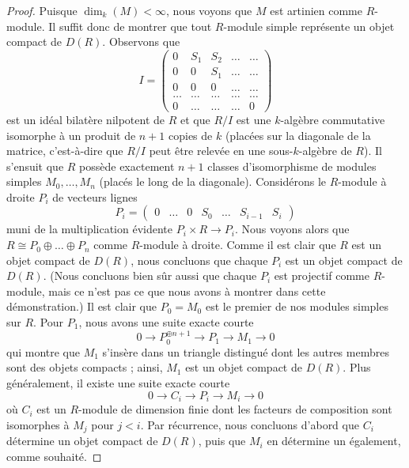 \begin{proof}
\medskip\noindent
Puisque $\dim_k(M) < \infty$, nous voyons que $M$ est artinien comme $R$-module.
Il suffit donc de montrer que tout $R$-module simple représente un
objet compact de $D(R)$. Observons que
$$
I =
\left(
\begin{matrix}
0 & S_1 & S_2 & \ldots & \ldots \\
0 & 0 & S_1 & \ldots & \ldots\\
0 & 0 & 0 & \ldots & \ldots \\
\ldots & \ldots & \ldots & \ldots & \ldots \\
0 & \ldots & \ldots & \ldots & 0
\end{matrix}
\right)
$$
est un idéal bilatère nilpotent de $R$ et que $R/I$
est une $k$-algèbre commutative isomorphe à un produit de $n + 1$ copies de
$k$ (placées sur la diagonale de la matrice, c'est-à-dire que $R/I$ peut être relevée
en une sous-$k$-algèbre de $R$). Il s'ensuit que $R$ possède exactement $n + 1$
classes d'isomorphisme de modules simples $M_0, \ldots, M_n$ (placés le long
de la diagonale). Considérons le $R$-module à droite $P_i$ de vecteurs lignes
$$
P_i =
\left(
\begin{matrix}
0 &
\ldots &
0 &
S_0 &
\ldots &
S_{i - 1} &
S_i
\end{matrix}
\right)
$$
muni de la multiplication évidente $P_i \times R \to P_i$. Nous voyons alors que
$R \cong P_0 \oplus \ldots \oplus P_n$ comme $R$-module à droite. Comme il est clair que
$R$ est un objet compact de $D(R)$, nous concluons que chaque $P_i$ est un objet compact
de $D(R)$. (Nous concluons bien sûr aussi que chaque $P_i$ est projectif
comme $R$-module, mais ce n'est pas ce que nous avons à montrer dans cette démonstration.)
Il est clair que $P_0 = M_0$ est le premier de nos modules simples sur $R$.
Pour $P_1$, nous avons une suite exacte courte
$$
0 \to P_0^{\oplus n + 1} \to P_1 \to M_1 \to 0
$$
qui montre que $M_1$ s'insère dans un triangle distingué dont
les autres membres sont des objets compacts ; ainsi, $M_1$ est un objet compact
de $D(R)$. Plus généralement, il existe une suite exacte courte
$$
0 \to C_i \to P_i \to M_i \to 0
$$
où $C_i$ est un $R$-module de dimension finie dont les facteurs de composition
sont isomorphes à $M_j$ pour $j < i$. Par récurrence, nous concluons d'abord que
$C_i$ détermine un objet compact de $D(R)$, puis que $M_i$
en détermine un également, comme souhaité.
\end{proof}

